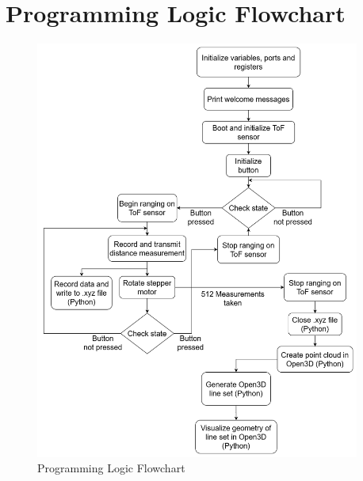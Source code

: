 \documentclass[12pt]{article}
\begin{document}
\section*{Programming Logic Flowchart}
\begin{figure}[h!]
    \centering
    \includegraphics[width=0.95\textwidth]{FlowChart.png}
    \caption{Programming Logic Flowchart}
    \label{fig:Flowchart}
\end{figure}
\end{document}
